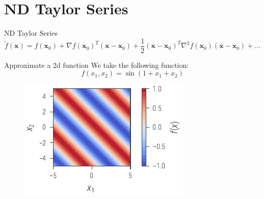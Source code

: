 \documentclass{beamer}
\begin{document}
\section{ND Taylor Series}

\begin{frame}{ND Taylor Series}
    \begin{equation*}
        \tilde{f}(\boldsymbol{x}) = f(\boldsymbol{x}_0) + \nabla f(\boldsymbol{x}_0)^T(\boldsymbol{x}-\boldsymbol{x}_0) + \frac{1}{2}(\boldsymbol{x}-\boldsymbol{x}_0)^T \nabla^2 f(\boldsymbol{x}_0)(\boldsymbol{x}-\boldsymbol{x}_0) + \dots
    \end{equation*}
\end{frame}

\begin{frame}{Approximate a 2d function}
    We take the following function:
    \begin{equation*}
        f(x_1, x_2) = \sin(1 + x_1 + x_2)
    \end{equation*}

    \begin{figure}
        \includegraphics[]{../figures/laplace-approx/sin2d.pdf}
    \end{figure}

\end{frame}
\end{document}
